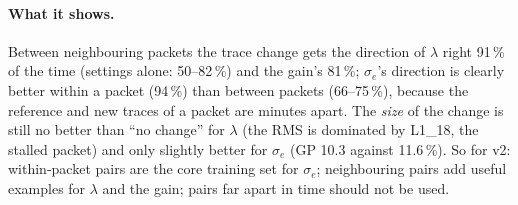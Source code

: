 \paragraph{What it shows.} Between neighbouring packets the trace change gets the direction of $\lambda$ right 91\,\% of the
time (settings alone: 50--82\,\%) and the gain's 81\,\%; $\sigma_e$'s direction is clearly better within a packet (94\,\%)
than between packets (66--75\,\%), because the reference and new traces of a packet are minutes apart. The \emph{size} of
the change is still no better than ``no change'' for $\lambda$ (the RMS is dominated by L1\_18, the stalled packet) and
only slightly better for $\sigma_e$ (GP 10.3 against 11.6\,\%). So for v2: within-packet pairs are the core training set
for $\sigma_e$; neighbouring pairs add useful examples for $\lambda$ and the gain; pairs far apart in time should not be
used.
